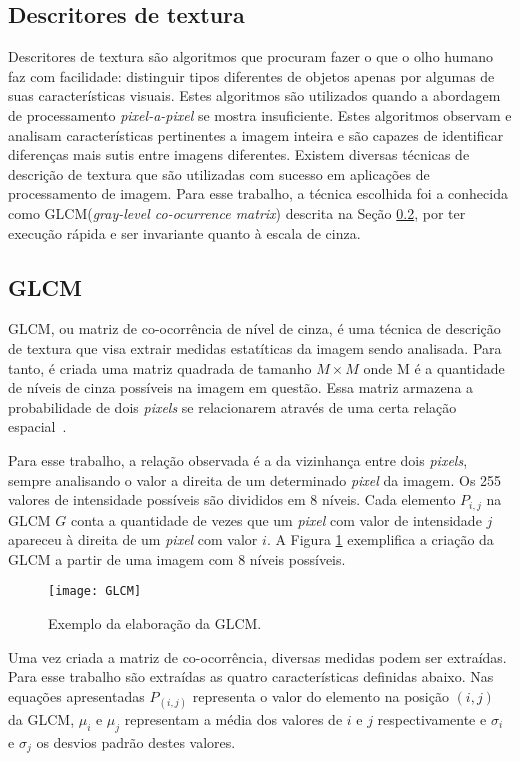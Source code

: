 \subsection{Descritores de textura}\label{sec:descritores}

Descritores de textura são algoritmos que procuram fazer o que o olho humano faz com facilidade: distinguir tipos diferentes de objetos apenas por algumas de suas características visuais. Estes algoritmos são utilizados quando a abordagem de processamento \textit{pixel-a-pixel} se mostra insuficiente. Estes algoritmos observam e analisam características pertinentes a imagem inteira e são capazes de identificar diferenças mais sutis entre imagens diferentes. Existem diversas técnicas de descrição de textura que são utilizadas com sucesso em aplicações de processamento de imagem. Para esse trabalho, a técnica escolhida foi a conhecida como GLCM(\textit{gray-level co-ocurrence matrix}) descrita na Seção \ref{sec:GLCM}, por ter execução rápida e ser invariante quanto à escala de cinza.

\subsection{GLCM}\label{sec:GLCM}

GLCM, ou matriz de co-ocorrência de nível de cinza, é uma técnica de descrição de textura que visa extrair medidas estatíticas da imagem sendo analisada. Para tanto, é criada uma matriz quadrada de tamanho $M\times M$ onde M é a quantidade de níveis de cinza possíveis na imagem em questão. Essa matriz armazena a probabilidade de dois \textit{pixels} se relacionarem através de uma certa relação espacial~\cite{GLCM}. 

Para esse trabalho, a relação observada é a da vizinhança entre dois \textit{pixels}, sempre analisando o valor a direita de um determinado \textit{pixel} da imagem. Os 255 valores de intensidade possíveis são divididos em 8 níveis. Cada elemento $P_{i,j}$ na GLCM $G$ conta a quantidade de vezes que um \textit{pixel} com valor de intensidade  $j$ apareceu à direita de um \textit{pixel} com valor $i$. A Figura \ref{fig:GLCM} exemplifica a criação da GLCM a partir de uma imagem com 8 níveis possíveis.

\begin{figure}
\texttt{[image: GLCM]} 
\centering
\caption[Exemplo da elaboração da GLCM]{Exemplo da elaboração da GLCM\protect\footnotemark.}
\label{fig:GLCM}
\centering
\end{figure}
Uma vez criada a matriz de co-ocorrência, diversas medidas podem ser extraídas. Para esse trabalho são extraídas as quatro características definidas abaixo. Nas equações apresentadas $P_{(i,j)}$ representa o valor do elemento na posição $(i,j)$ da GLCM, $\mu_i$ e $\mu_j$ representam a média dos valores de $i$ e $j$ respectivamente e $\sigma_i$ e $\sigma_j$ os desvios padrão destes valores.

